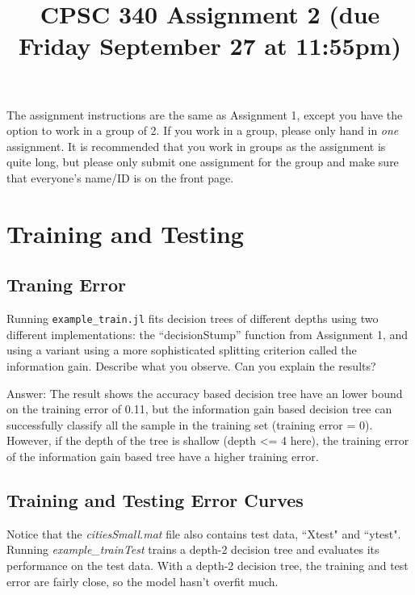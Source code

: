\documentclass{article}
\def\ans#1{\par\gre{Answer: #1}}
\def\blu#1{{\color{blu}#1}}
\def\gre#1{{\color{gre}#1}}
\begin{document}
\title{CPSC 340 Assignment 2 (due Friday September 27 at 11:55pm)}
\author{}
\date{}
\maketitle
\vspace{-4em}

The assignment instructions are the same as Assignment 1, except you have the option to work in a group of 2. If you work in a group, please only hand in \emph{one} assignment. It is recommended that you work in groups as the assignment is quite long, but please only submit one assignment for the group and make sure that everyone's name/ID is on the front page.



\section{Training and Testing}

\subsection{Traning Error}

Running \texttt{example\_train.jl} fits decision trees of different depths using two different implementations:
the ``decisionStump'' function from Assignment 1, and using a variant using a more sophisticated splitting criterion called the information gain. \blu{Describe what you observe. Can you explain the results?}
\ans{The result shows the accuracy based decision tree have an lower bound on the training error of 0.11, but the information gain based decision tree can successfully classify all the sample in the training set (training error = 0).\\
However, if the depth of the tree is shallow (depth <= 4 here), the training error of the information gain based tree have a higher training error.}



\subsection{Training and Testing Error Curves}

Notice that the \emph{citiesSmall.mat} file also contains test data, ``Xtest" and ``ytest". 
Running \emph{example\_trainTest} trains a depth-2 decision tree and evaluates its performance on the test data. %
With a depth-2 decision tree, the training and test error are fairly close, so the model hasn't overfit much.
\end{document}
